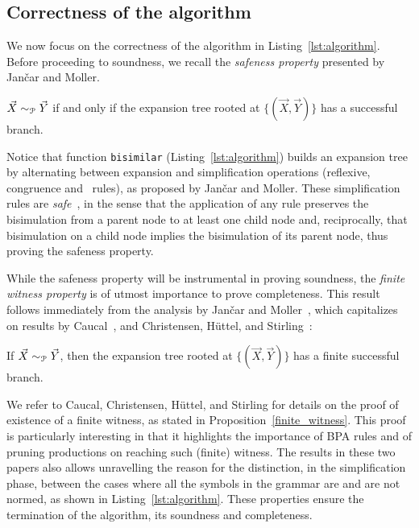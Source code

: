 \subsection{Correctness of the algorithm}

We now focus on the correctness of the algorithm in
Listing~\ref{lst:algorithm}.  Before proceeding to soundness, we
recall the \emph{safeness property} presented by Jan{\v{c}}ar and
Moller.

\begin{proposition} 
  \label{prop:safeness}
  $\vec X \sim_\mathcal P \vec Y$ if and only if the expansion tree rooted
  at $\{(\vec X, \vec Y)\}$ has a successful branch.
\end{proposition}

Notice that function \lstinline|bisimilar|
(Listing~\ref{lst:algorithm}) builds an expansion tree by alternating
between expansion and simplification operations (reflexive,
congruence and \BPA\ rules), as proposed by Jan{\v{c}}ar and Moller.
%
These simplification rules are \emph{safe}~\cite{janvcar1999techniques}, in the sense that the
application of any rule preserves the bisimulation from a parent node
to at least one child node and, reciprocally, that bisimulation on a
child node implies the bisimulation of its parent node, thus proving
the safeness property.

While the safeness property will be instrumental in proving
soundness, the \emph{finite witness property} is of
utmost importance to prove completeness. This result follows
immediately from the analysis by Jan{\v{c}}ar and
Moller~\cite{janvcar1999techniques}, which capitalizes on results by
Caucal~\cite{caucal1986decidabilite}, and Christensen, H{\"{u}}ttel, and
Stirling~\cite{DBLP:journals/iandc/ChristensenHS95}:

\begin{proposition} 
\label{finite_witness}
	If $\vec X \sim_\mathcal P \vec Y$, then the expansion tree rooted at
	$\{(\vec X, \vec Y)\}$ has a finite successful branch.
\end{proposition}

We refer to Caucal, Christensen, H{\"{u}}ttel, and Stirling for
details on the proof of existence of a finite witness, as stated in
Proposition~\ref{finite_witness}. This proof is particularly
interesting in that it highlights the importance of BPA rules and of
pruning productions on reaching such (finite) witness. The results in
these two papers also allows unravelling the reason for the
distinction, in the simplification phase, between the cases where all
the symbols in the grammar are and are not normed, as shown in
Listing~\ref{lst:algorithm}.
%
These properties ensure the termination of the algorithm, its soundness
and completeness.

